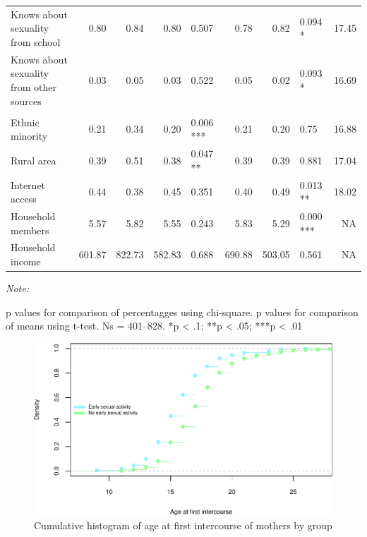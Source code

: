 \documentclass[
]{article}
\begin{document}
\begin{landscape}
\begin{table}[!h]
{\begin{threeparttable}
\begin{tabular}[t]{lrrrlrrlr}
\hspace{1em}Knows about sexuality from school & 0.80 & 0.84 & 0.80 & 0.507 & 0.78 & 0.82 & 0.094 * & 17.45\\
\hspace{1em}Knows about sexuality from other sources & 0.03 & 0.05 & 0.03 & 0.522 & 0.05 & 0.02 & 0.093 * & 16.69\\
\addlinespace[2em]
\multicolumn{9}{l}{\textit{Household-related variables}}\\
\hspace{1em}Ethnic minority & 0.21 & 0.34 & 0.20 & 0.006 *** & 0.21 & 0.20 & 0.75 & 16.88\\
\hspace{1em}Rural area & 0.39 & 0.51 & 0.38 & 0.047 ** & 0.39 & 0.39 & 0.881 & 17.04\\
\hspace{1em}Internet access & 0.44 & 0.38 & 0.45 & 0.351 & 0.40 & 0.49 & 0.013 ** & 18.02\\
\hspace{1em}Household members & 5.57 & 5.82 & 5.55 & 0.243 & 5.83 & 5.29 & 0.000 *** & NA\\
\hspace{1em}Household income & 601.87 & 822.73 & 582.83 & 0.688 & 690.88 & 503.05 & 0.561 & NA\\
\bottomrule
\end{tabular}
\begin{tablenotes}[para]
\item \textit{Note: } 
\item p values for comparison of percentagges using chi-square. p values for comparison of means using t-test. Ns = 401–828. *p < .1; **p < .05; ***p < .01
\end{tablenotes}
\end{threeparttable}}
\end{table}
\end{landscape}
\newpage

\begin{figure}

{\centering \includegraphics[width=0.8\linewidth,height=0.7\textheight]{early_sexual_activity_report_files/figure-latex/unnamed-chunk-5-1} 

}

\caption{Cumulative histogram of age at first intercourse of mothers by group}\label{fig:unnamed-chunk-5}
\end{figure}
\end{document}
